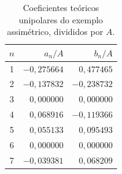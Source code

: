 \begin{table}[H]
\centering
\footnotesize\setlength{\tabcolsep}{3.5pt}
\caption{Coeficientes teóricos unipolares do exemplo assimétrico, divididos por $A$.}\label{tab:ret2}
\begin{tabular}{crr}\hline
$n$ & $a_n/A$ & $b_n/A$ \\ \hline
1 & $-0{,}275664$ & $0{,}477465$ \\
2 & $-0{,}137832$ & $-0{,}238732$ \\
3 & $0{,}000000$ & $0{,}000000$ \\
4 & $0{,}068916$ & $-0{,}119366$ \\
5 & $0{,}055133$ & $0{,}095493$ \\
6 & $0{,}000000$ & $0{,}000000$ \\
7 & $-0{,}039381$ & $0{,}068209$ \\
\hline\end{tabular}
\end{table}
